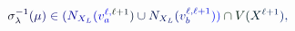 \documentclass[12pt]{article}
\begin{document}
\makeatletter
\renewcommand*{\@textcolor}[3]{%
  \protect\leavevmode
  \begingroup
    \color#1{#2}#3%
  \endgroup
}
\makeatother
\begin{displaymath}
\mathcolor[RGB]{0,0,15}{\sigma} _ { \mathcolor[RGB]{0,0,30}{\lambda} } ^ { \mathcolor[RGB]{0,0,45}{-} \mathcolor[RGB]{0,0,60}{1} } \mathcolor[RGB]{0,0,75}{(} \mathcolor[RGB]{0,0,90}{\mu} \mathcolor[RGB]{0,0,105}{)} \mathcolor[RGB]{0,0,120}{\in} \mathcolor[RGB]{0,0,135}{(} \mathcolor[RGB]{0,0,150}{N} _ { \mathcolor[RGB]{0,0,165}{X} _ { \mathcolor[RGB]{0,0,180}{L} } } \mathcolor[RGB]{0,0,195}{(} \mathcolor[RGB]{0,0,210}{v} _ { \mathcolor[RGB]{0,0,225}{a} } ^ { \mathcolor[RGB]{0,0,240}{\ell} \mathcolor[RGB]{0,0,255}{,} \mathcolor[RGB]{0,15,0}{\ell} \mathcolor[RGB]{0,15,15}{+} \mathcolor[RGB]{0,15,30}{1} } \mathcolor[RGB]{0,15,45}{)} \mathcolor[RGB]{0,15,60}{\cup} \mathcolor[RGB]{0,15,75}{N} _ { \mathcolor[RGB]{0,15,90}{X} _ { \mathcolor[RGB]{0,15,105}{L} } } \mathcolor[RGB]{0,15,120}{(} \mathcolor[RGB]{0,15,135}{v} _ { \mathcolor[RGB]{0,15,150}{b} } ^ { \mathcolor[RGB]{0,15,165}{\ell} \mathcolor[RGB]{0,15,180}{,} \mathcolor[RGB]{0,15,195}{\ell} \mathcolor[RGB]{0,15,210}{+} \mathcolor[RGB]{0,15,225}{1} } \mathcolor[RGB]{0,15,240}{)} \mathcolor[RGB]{0,15,255}{)} \mathcolor[RGB]{0,30,0}{\cap} \mathcolor[RGB]{0,30,15}{V} \mathcolor[RGB]{0,30,30}{(} \mathcolor[RGB]{0,30,45}{X} ^ { \mathcolor[RGB]{0,30,60}{\ell} \mathcolor[RGB]{0,30,75}{+} \mathcolor[RGB]{0,30,90}{1} } \mathcolor[RGB]{0,30,105}{)} \mathcolor[RGB]{0,30,120}{,}
\end{displaymath}
\end{document}
